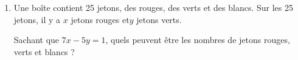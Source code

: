 \documentclass{cornouaille}
\begin{document}
\begin{colonne*exercice}
\begin{exercice}
\begin{enumerate}
\vspace{-\baselineskip}
\begin{enumerate}
\item Vérifier que le couple (3 ; 4) est solution de (E).
\item Montrer que le couple d'entiers $(x ; y)$ est solution de (E) si, et seulement si, $7(x - 3) = 5(y - 4)$.
\item Montrer que les solutions entières de l’équation (E) sont
  exactement les couples $(x ; y)$ d’entiers\linebreak relatifs tels que :
$$\left\{\begin{aligned}
&x = 5k + 3\\
&y = 7k + 4\end{aligned}\right.\enskip \text{où}\enskip k\in\Z.$$
\end{enumerate}
\item Une boîte contient 25 jetons, des rouges, des verts et des
  blancs. Sur les 25 jetons, il y a $x$ jetons rouges et\linebreak $y$
  jetons verts. 

  Sachant que $7x-5y = 1$, quels peuvent être les nombres de jetons
  rouges, verts et blancs ?
\end{enumerate}
\end{exercice}


\end{colonne*exercice}
\end{document}
